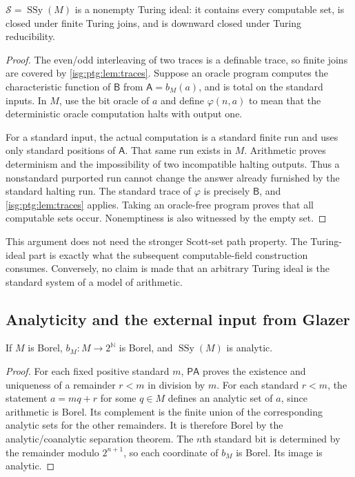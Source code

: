 \documentclass[11pt]{article}
\theoremstyle{definition}
\theoremstyle{remark}
\newcommand{\N}{\mathbb{N}}
\newcommand{\PA}{\mathsf{PA}}
\newcommand{\SSy}{\operatorname{SSy}}
\begin{document}
\begin{lemma}\label{isg:ptg:lem:ideal}
$\mathcal S=\SSy(M)$ is a nonempty Turing ideal: it contains every
computable set, is closed under finite Turing joins, and is downward closed
under Turing reducibility.
\end{lemma}
\begin{proof}
The even/odd interleaving of two traces is a definable trace, so finite
joins are covered by \cref{isg:ptg:lem:traces}. Suppose an oracle program
computes the characteristic function of $\mathsf B$ from
$\mathsf A=b_M(a)$, and is total on the standard inputs. In $M$, use the bit
oracle of $a$ and define $\varphi(n,a)$ to mean that the deterministic
oracle computation halts with output one.

For a standard input, the actual computation is a standard finite run and
uses only standard positions of $\mathsf A$. That same run exists in $M$.
Arithmetic proves determinism and the impossibility of two incompatible
halting outputs. Thus a nonstandard purported run cannot change the answer
already furnished by the standard halting run. The standard trace of
$\varphi$ is precisely $\mathsf B$, and \cref{isg:ptg:lem:traces} applies.
Taking an oracle-free program proves that all computable sets occur.
Nonemptiness is also witnessed by the empty set.
\end{proof}

This argument does not need the stronger Scott-set path property. The
Turing-ideal part is exactly what the subsequent computable-field
construction consumes. Conversely, no claim is made that an arbitrary
Turing ideal is the standard system of a model of arithmetic.

\subsection{Analyticity and the external input from Glazer}\label{isg:ptg:sec:glazer}
\begin{lemma}\label{isg:ptg:lem:analyticss}
If $M$ is Borel, $b_M:M\to2^\N$ is Borel, and $\SSy(M)$ is analytic.
\end{lemma}
\begin{proof}
For each fixed positive standard $m$, $\PA$ proves the existence and
uniqueness of a remainder $r<m$ in division by $m$. For each standard
$r<m$, the statement $a=mq+r$ for some $q\in M$ defines an analytic set of
$a$, since arithmetic is Borel. Its complement is the finite union of the
corresponding analytic sets for the other remainders. It is therefore
Borel by the analytic/coanalytic separation theorem. The $n$th standard
bit is determined by the remainder modulo $2^{n+1}$, so each coordinate of
$b_M$ is Borel. Its image is analytic.
\end{proof}
\end{document}
